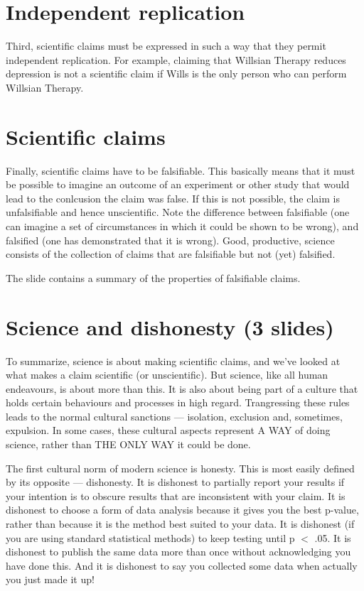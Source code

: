 \documentclass[12pt]{article}
\begin{document}
\section{Independent replication}

Third, scientific claims must be expressed in such a way that they
permit independent replication. For example, claiming that Willsian
Therapy reduces depression is not a scientific claim if Wills is the
only person who can perform Willsian Therapy.

\section{Scientific claims}

Finally, scientific claims have to be falsifiable. This basically
means that it must be possible to imagine an outcome of an experiment
or other study that would lead to the conlcusion the claim was
false. If this is not possible, the claim is unfalsifiable and hence
unscientific. Note the difference between falsifiable (one can imagine
a set of circumstances in which it could be shown to be wrong), and
falsified (one has demonstrated that it is wrong). Good, productive,
science consists of the collection of claims that are falsifiable but
not (yet) falsified.

The slide contains a summary of the properties of falsifiable claims.

\section{Science and dishonesty (3 slides)}

To summarize, science is about making scientific claims, and we've
looked at what makes a claim scientific (or unscientific). But
science, like all human endeavours, is about more than this. It is
also about being part of a culture that holds certain behaviours and
processes in high regard. Trangressing these rules leads to the normal
cultural sanctions --- isolation, exclusion and, sometimes,
expulsion. In some cases, these cultural aspects represent A WAY of
doing science, rather than THE ONLY WAY it could be done.
		
The first cultural norm of modern science is honesty. This is most
easily defined by its opposite --- dishonesty. It is dishonest to
partially report your results if your intention is to obscure results
that are inconsistent with your claim. It is dishonest to choose a
form of data analysis because it gives you the best p-value, rather
than because it is the method best suited to your data.  It is
dishonest (if you are using standard statistical methods) to keep
testing until p $<$ .05. It is dishonest to publish the same data more
than once without acknowledging you have done this. And it is
dishonest to say you collected some data when actually you just made
it up!
		
\end{document}
